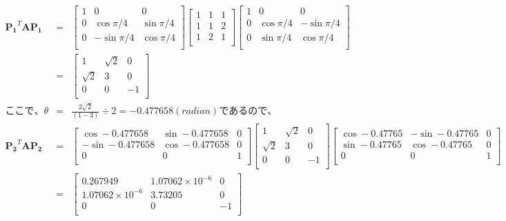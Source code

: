\documentclass[a4j,twoside,openright,11pt]{jsarticle}
\begin{document}
\begin{eqnarray}
  \bm{P_1}^{T}\bm{A}\bm{P_1} 
  &=& 
  \left[
  \begin{array}{ccc}
  1&0&0\\
  0&\cos \pi/4 &\sin \pi/4\\
  0&-\sin \pi/4 &\cos \pi/4\\
  \end{array}
  \right]
  \left[
    \begin{array}{rrr}
      1 & 1 & 1 \\
      1 & 1 & 2 \\
      1 & 2 & 1 \\
    \end{array}
  \right]
  \left[
  \begin{array}{ccc}
  1&0&0\\
  0&\cos \pi/4 &-\sin \pi/4\\
  0&\sin \pi/4 &\cos \pi/4\\
  \end{array}
  \right]
\nonumber\\
  &=&
  \left[
  \begin{array}{ccc}
  1&\sqrt{2}&0\\
  \sqrt{2}&3 &0\\
  0&0 &-1\\
  \end{array}
  \right]
\nonumber
\\
ここで、\theta &=& \frac{2\sqrt{2}}{(1-3)} \div 2 =-0.477658 (radian)であるので、
\nonumber
\\
  \bm{P_2}^{T}\bm{A}\bm{P_2} 
  &=& 
  \left[
  \begin{array}{ccc}
  \cos -0.477658 &\sin -0.477658  &0\\
  -\sin -0.477658 &\cos -0.477658 &0\\
  0&0&1\\
  \end{array}
  \right]
  \left[
  \begin{array}{ccc}
  1&\sqrt{2}&0\\
  \sqrt{2}&3 &0\\
  0&0 &-1\\
  \end{array}
  \right]
  \left[
  \begin{array}{ccc}
  \cos -0.47765 &-\sin -0.47765&0\\
  \sin -0.47765 &\cos -0.47765&0\\
  0&0&1\\
  \end{array}
  \right]
\nonumber
\\
  &=&
  \left[
  \begin{array}{ccc}
  0.267949 & 1.07062 \times 10^{-6}&0\\
  1.07062 \times 10^{-6} &3.73205&0\\
  0&0&-1\\
  \end{array}
  \right]
\end{eqnarray}
\end{document}
